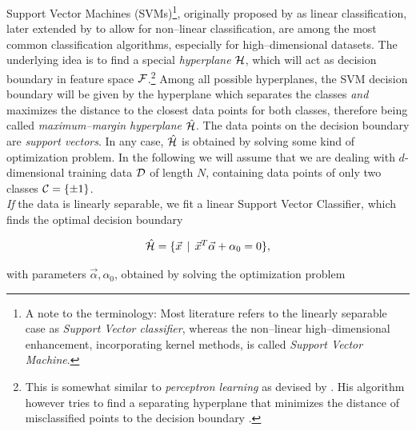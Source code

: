 Support Vector Machines (SVMs)\footnote{A note to the terminology: Most literature refers to the linearly separable case as \emph{Support Vector classifier}, whereas the non--linear high--dimensional enhancement, incorporating kernel methods, is called \emph{Support Vector Machine}.}, originally proposed by \citet{vapnik1963} as linear classification, later extended by \citet{cortes1995} to allow for non--linear classification, are among the most common classification algorithms, especially for high--dimensional datasets. The underlying idea is to find a special \emph{hyperplane} $\mathcal{H}$, which will act as decision boundary in feature space $\mathcal{F}$.\footnote{This is somewhat similar to \emph{perceptron learning} as devised by \citet{rosenblatt1958}. His algorithm however tries to find a separating hyperplane that minimizes the distance of misclassified points to the decision boundary \citep{hastie2001}.} Among all possible hyperplanes, the SVM decision boundary will be given by the hyperplane which separates the classes \emph{and} maximizes the distance to the closest data points for both classes, therefore being called \emph{maximum--margin hyperplane} $\hat {\mathcal{H}}$. The data points on the decision boundary are \emph{support vectors}. In any case, $\hat {\mathcal{H}}$ is obtained by solving some kind of optimization problem. In the following we will assume that we are dealing with $d$-dimensional training data $\mathcal{D}$ of length $N$, containing data points of only two classes $\mathcal{C} = \{ \pm 1 \}$. \\



\emph{If} the data is linearly separable, we fit a linear Support Vector Classifier, which finds the optimal decision boundary

\begin{equation}
\hat {\mathcal{H}} = \{ \vec x \, \mid \, \vec x^T \vec \alpha + \alpha_0 = 0 \},
\end{equation}

with parameters $\vec \alpha, \alpha_0$, obtained by solving the optimization problem

